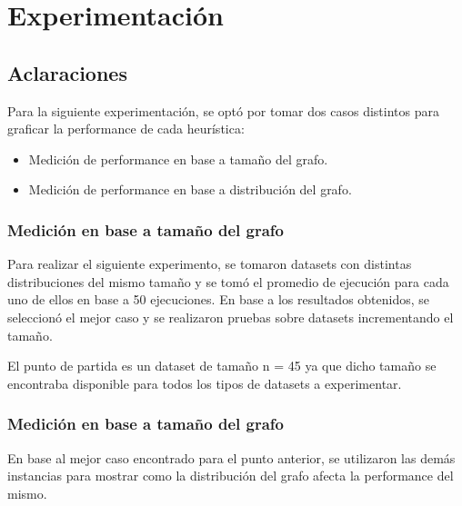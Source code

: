 \section{Experimentación}

\subsection{Aclaraciones}

Para la siguiente experimentación, se optó por tomar dos casos distintos para graficar la performance de cada heurística:

\begin{itemize}
\item Medición de performance en base a tamaño del grafo.
\item Medición de performance en base a distribución del grafo.
\end{itemize}

\subsubsection{Medición en base a tamaño del grafo}
Para realizar el siguiente experimento, se tomaron datasets con distintas distribuciones del mismo tamaño y se tomó el promedio de ejecución para cada uno de ellos en base a 50 ejecuciones. En base a los resultados obtenidos, se seleccionó el mejor caso y se realizaron pruebas sobre datasets incrementando el tamaño.

\vskip 8pt

El punto de partida es un dataset de tamaño n = 45 ya que dicho tamaño se encontraba disponible para todos los tipos de datasets a experimentar.

\subsubsection{Medición en base a tamaño del grafo}
En base al mejor caso encontrado para el punto anterior, se utilizaron las demás instancias para mostrar como la distribución del grafo afecta la performance del mismo.







